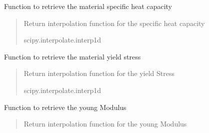 \documentclass[letterpaper,10pt,english]{sphinxmanual}
\begin{document}
\begin{fulllineitems}
\begin{fulllineitems}
\label{\detokenize{modules:material.Material.material_specificHeatCapacity}}
\pysigstartsignatures
{}
\pysigstopsignatures
\sphinxAtStartPar
Function to retrieve the material specific heat capacity
\begin{quote}\begin{description}
\sphinxAtStartPar
{} \textendash{} Return interpolation function for the specific heat capacity

\sphinxAtStartPar
scipy.interpolate.interp1d

\end{description}\end{quote}

\end{fulllineitems}


\begin{fulllineitems}
\label{\detokenize{modules:material.Material.material_yieldStress}}
\pysigstartsignatures
{}
\pysigstopsignatures
\sphinxAtStartPar
Function to retrieve the material yield stress
\begin{quote}\begin{description}
\sphinxAtStartPar
{} \textendash{} Return interpolation function for the yield Stress

\sphinxAtStartPar
scipy.interpolate.interp1d

\end{description}\end{quote}

\end{fulllineitems}


\begin{fulllineitems}
\label{\detokenize{modules:material.Material.material_youngModulus}}
\pysigstartsignatures
{}
\pysigstopsignatures
\sphinxAtStartPar
Function to retrieve the young Modulus
\begin{quote}\begin{description}
\sphinxAtStartPar
{} \textendash{} Return interpolation function for the young Modulus


\end{description}
\end{quote}
\end{fulllineitems}
\end{fulllineitems}
\end{document}

